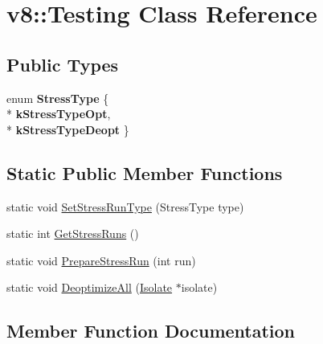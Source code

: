 \hypertarget{classv8_1_1_testing}{}\section{v8\+:\+:Testing Class Reference}
\label{classv8_1_1_testing}
\subsection*{Public Types}
\begin{DoxyCompactItemize}
\item 
enum {\bfseries Stress\+Type} \{ \\*
{\bfseries k\+Stress\+Type\+Opt}, 
\\*
{\bfseries k\+Stress\+Type\+Deopt}
 \}\hypertarget{classv8_1_1_testing_a436a1a521a0bc070cc0b46ad7a658575}{}\label{classv8_1_1_testing_a436a1a521a0bc070cc0b46ad7a658575}

\end{DoxyCompactItemize}
\subsection*{Static Public Member Functions}
\begin{DoxyCompactItemize}
\item 
static void \hyperlink{classv8_1_1_testing_aafa5a4917998aa64134aa750ce5c4b2e}{Set\+Stress\+Run\+Type} (Stress\+Type type)
\item 
static int \hyperlink{classv8_1_1_testing_adc876063b1e07462b8d9544dd8efab36}{Get\+Stress\+Runs} ()
\item 
static void \hyperlink{classv8_1_1_testing_ab9da044b18b9d05770b655bed27ed7f4}{Prepare\+Stress\+Run} (int run)
\item 
static void \hyperlink{classv8_1_1_testing_ac0881a3cee2f8f91039d3ecdb15dbf27}{Deoptimize\+All} (\hyperlink{classv8_1_1_isolate}{Isolate} $\ast$isolate)
\end{DoxyCompactItemize}


\subsection{Member Function Documentation}
